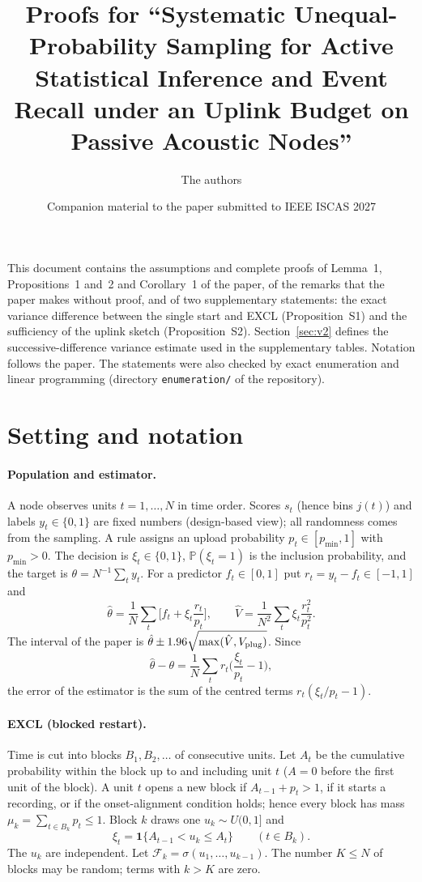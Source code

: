 \documentclass[11pt]{article}
\title{Proofs for ``Systematic Unequal-Probability Sampling for Active Statistical Inference and Event Recall under an Uplink Budget on Passive Acoustic Nodes''}
\author{The authors}
\date{Companion material to the paper submitted to IEEE ISCAS 2027}
\theoremstyle{remark}
\renewcommand{\Pr}{\mathbb{P}}
\newcommand{\one}{\mathbf 1}
\newcommand{\Fk}{\mathcal F}
\newcommand{\hth}{\hat\theta}
\newcommand{\hV}{\hat V}
\begin{document}
\sloppy
\maketitle

\noindent This document contains the assumptions and complete proofs of Lemma~1, Propositions~1 and~2 and Corollary~1 of the paper, of the remarks that the paper makes without proof, and of two supplementary statements: the exact variance difference between the single start and EXCL (Proposition~S1) and the sufficiency of the uplink sketch (Proposition~S2). Section~\ref{sec:v2} defines the successive-difference variance estimate used in the supplementary tables. Notation follows the paper. The statements were also checked by exact enumeration and linear programming (directory \texttt{enumeration/} of the repository).

\tableofcontents

\section{Setting and notation}\label{sec:setting}
\paragraph{Population and estimator.}
A node observes units $t=1,\dots,N$ in time order. Scores $s_t$ (hence bins $j(t)$) and labels $y_t\in\{0,1\}$ are fixed numbers (design-based view); all randomness comes from the sampling. A rule assigns an upload probability $p_t\in[p_{\min},1]$ with $p_{\min}>0$. The decision is $\xi_t\in\{0,1\}$, $\Pr(\xi_t=1)$ is the inclusion probability, and the target is $\theta=N^{-1}\sum_t y_t$. For a predictor $f_t\in[0,1]$ put $r_t=y_t-f_t\in[-1,1]$ and
\begin{equation}
\hth=\frac1N\sum_t\Big[f_t+\xi_t\frac{r_t}{p_t}\Big],\qquad
\hV=\frac1{N^2}\sum_t\xi_t\frac{r_t^2}{p_t^2}.\tag{1}
\end{equation}
The interval of the paper is $\hth\pm1.96\sqrt{\max(\hV,V_{\rm plug})}$. Since
\begin{equation}
\hth-\theta=\frac1N\sum_t r_t\Big(\frac{\xi_t}{p_t}-1\Big),\tag{2}
\end{equation}
the error of the estimator is the sum of the centred terms $r_t(\xi_t/p_t-1)$.

\paragraph{EXCL (blocked restart).}
Time is cut into blocks $B_1,B_2,\dots$ of consecutive units. Let $A_t$ be the cumulative probability within the block up to and including unit $t$ ($A=0$ before the first unit of the block). A unit $t$ opens a new block if $A_{t-1}+p_t>1$, if it starts a recording, or if the onset-alignment condition holds; hence every block has mass $\mu_k=\sum_{t\in B_k}p_t\le1$. Block $k$ draws one $u_k\sim U(0,1]$ and
\[
\xi_t=\one\{A_{t-1}<u_k\le A_t\}\qquad(t\in B_k).
\]
The $u_k$ are independent. Let $\Fk_k=\sigma(u_1,\dots,u_{k-1})$. The number $K\le N$ of blocks may be random; terms with $k>K$ are zero.
\end{document}
